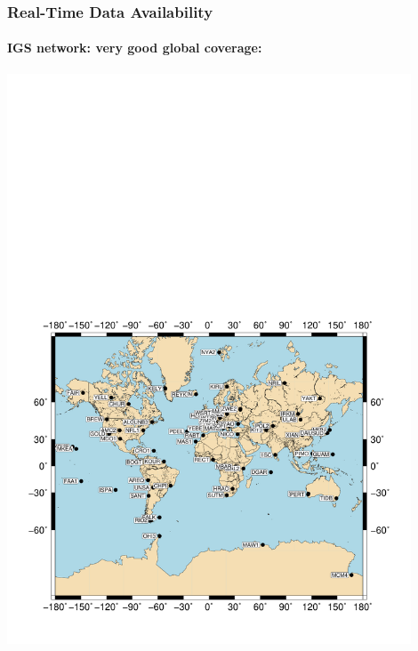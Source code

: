 \documentclass[10pt]{beamer}
\begin{document}
\begin{frame}
  \frametitle{Real-Time Data Availability}
  \framesubtitle{IGS network: very good global coverage:}
  \vspace*{-5.5cm}
  \begin{center}
    \includegraphics[width=0.9\textwidth]{map.pdf}
  \end{center}
\end{frame}

\end{document}
